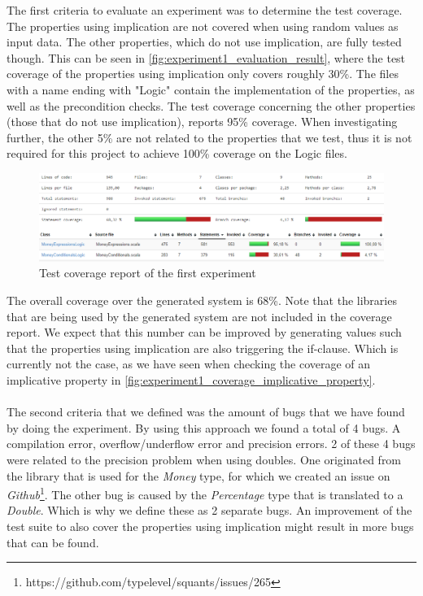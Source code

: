 The first criteria to evaluate an experiment was to determine the test coverage. The properties using implication are not covered when using random values as input data. The other properties, which do not use implication, are fully tested though. This can be seen in \autoref{fig:experiment1_evaluation_result}, where the test coverage of the properties using implication only covers roughly 30\%. The files with a name ending with "Logic" contain the implementation of the properties, as well as the precondition checks. The test coverage concerning the other properties (those that do not use implication), reports 95\% coverage. When investigating further, the other 5\% are not related to the properties that we test, thus it is not required for this project to achieve 100\% coverage on the Logic files.
\FloatBarrier
\begin{figure}[!ht]
	\includegraphics[width=\linewidth]{figures/eval_experiment1}
\caption{Test coverage report of the first experiment}
\label{fig:experiment1_evaluation_result}
\centering
\end{figure}
\FloatBarrier
The overall coverage over the generated system is 68\%. Note that the libraries that are being used by the generated system are not included in the coverage report. We expect that this number can be improved by generating values such that the properties using implication are also triggering the if-clause. Which is currently not the case, as we have seen when checking the coverage of an implicative property in \autoref{fig:experiment1_coverage_implicative_property}.\\
\\
The second criteria that we defined was the amount of bugs that we have found by doing the experiment. By using this approach we found a total of 4 bugs. A compilation error, overflow/underflow error and precision errors. 2 of these 4 bugs were related to the precision problem when using doubles. One originated from the library that is used for the \textit{Money} type, for which we created an issue on \textit{Github}\footnote{https://github.com/typelevel/squants/issues/265}. The other bug is caused by the \textit{Percentage} type that is translated to a \textit{Double}. Which is why we define these as 2 separate bugs. An improvement of the test suite to also cover the properties using implication might result in more bugs that can be found.

